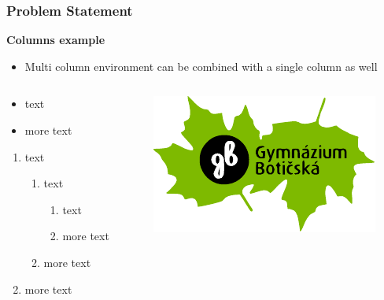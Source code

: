\begin{frame}
   \frametitle{Problem Statement}
   \textbf{\color{gybotgreen}Columns example}
   \begin{itemize}\justifying
      \item Multi column environment can be combined with a single column as well  
   \end{itemize}
   \begin{columns}[t, onlytextwidth]
      \begin{column}[T]{0.70\textwidth}
	 \begin{itemize}\justifying
	    \item text
	    \item more text
	 \end{itemize}
    \begin{enumerate}\justifying
      \item text
      \begin{enumerate}\justifying
         \item text
         \begin{enumerate}\justifying
            \item text
            \item more text
         \end{enumerate}
         \item more text
      \end{enumerate}
      \item more text
   \end{enumerate}
      \end{column}
      \begin{column}[T]{0.28\textwidth}
	 \includegraphics[width=\columnwidth]{logo/gybot-logo-leaves.pdf}
      \end{column}
   \end{columns}

\end{frame}
